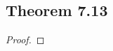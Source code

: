 \documentclass[../../main.tex]{subfiles}
\begin{document}
\subsection{Theorem 7.13}
\begin{wts}

\end{wts}
\begin{proof}

\end{proof}
\end{document}
